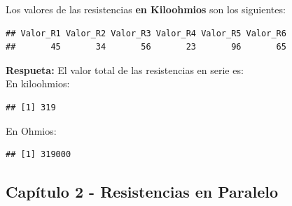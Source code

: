 \documentclass[10pt]{article}\usepackage[]{graphicx}\usepackage[]{color}
\makeatletter
\newenvironment{kframe}{%
 \def\at@end@of@kframe{}%
 \ifinner\ifhmode%
  \def\at@end@of@kframe{\end{minipage}}%
  \begin{minipage}{\columnwidth}%
 \fi\fi%
 \def\FrameCommand##1{\hskip\@totalleftmargin \hskip-\fboxsep
 \colorbox{shadecolor}{##1}\hskip-\fboxsep
     \hskip-\linewidth \hskip-\@totalleftmargin \hskip\columnwidth}%
 \MakeFramed {\advance\hsize-\width
   \@totalleftmargin\z@ \linewidth\hsize
   \@setminipage}}%
 {\par\unskip\endMakeFramed%
 \at@end@of@kframe}
\newenvironment{knitrout}{}{} %
\makeatother
\begin{document}
\begin{enumerate}
Los valores de las resistencias \textbf{en Kiloohmios}  son los siguientes:
\begin{knitrout}
\color{fgcolor}\begin{kframe}
\begin{verbatim}
## Valor_R1 Valor_R2 Valor_R3 Valor_R4 Valor_R5 Valor_R6 
##       45       34       56       23       96       65
\end{verbatim}
\end{kframe}
\end{knitrout}

\textbf{Respueta: }El valor total de las resistencias en serie es:\\
En kiloohmios:
\begin{knitrout}
\color{fgcolor}\begin{kframe}
\begin{verbatim}
## [1] 319
\end{verbatim}
\end{kframe}
\end{knitrout}
En Ohmios:
\begin{knitrout}
\color{fgcolor}\begin{kframe}
\begin{verbatim}
## [1] 319000
\end{verbatim}
\end{kframe}
\end{knitrout}

\newpage 



\end{enumerate}
	

	
	\subsection{Capítulo 2 - Resistencias en Paralelo}
	
\end{document}
